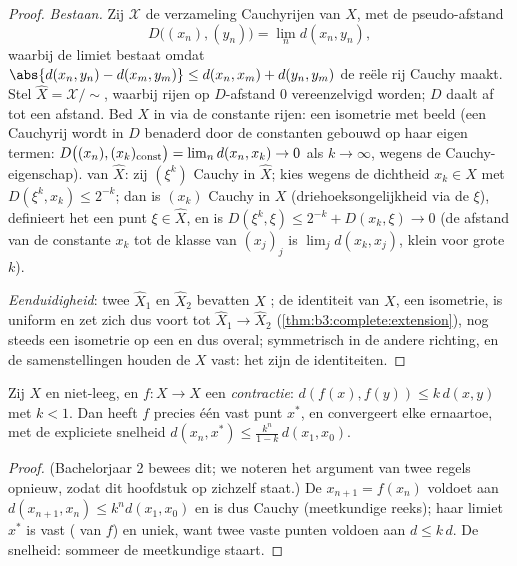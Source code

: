 \begin{proof}
\emph{Bestaan.} Zij $\mathcal X$ de verzameling Cauchyrijen van
$X$, met de pseudo-afstand
\[
D\bigl((x_n), (y_n)\bigr) = \lim_n d(x_n, y_n),
\]
waarbij de limiet bestaat omdat $\abs{d(x_n, y_n) - d(x_m, y_m)}
\leq d(x_n, x_m) + d(y_n, y_m)$ de reële rij Cauchy maakt. Stel
$\hat X = \mathcal X/{\sim}$, waarbij rijen op $D$-afstand $0$
vereenzelvigd worden; $D$ daalt af tot een afstand. Bed $X$ in via
de constante rijen: een isometrie met  beeld (een Cauchyrij
wordt in $D$ benaderd door de constanten gebouwd op haar eigen
termen: $D\bigl((x_n), (x_k)_{\rm const}\bigr) = \lim_n d(x_n,
x_k) \to 0$ als $k \to \infty$, wegens de Cauchy-eigenschap).
 van $\hat X$: zij $(\xi^k)$ Cauchy in $\hat X$; kies
wegens de dichtheid $x_k \in X$ met $D(\xi^k, x_k) \leq 2^{-k}$;
dan is $(x_k)$ Cauchy in $X$ (driehoeksongelijkheid via de $\xi$),
definieert het een punt $\xi \in \hat X$, en is $D(\xi^k, \xi)
\leq 2^{-k} + D(x_k, \xi) \to 0$ (de afstand van de constante
$x_k$ tot de klasse van $(x_j)_j$ is $\lim_j d(x_k, x_j)$, klein
voor grote $k$).

\emph{Eenduidigheid}: twee  $\hat X_1$ en $\hat
X_2$ bevatten $X$ ; de identiteit van $X$, een isometrie, is
uniform  en zet zich dus voort tot $\hat X_1 \to \hat X_2$
(\cref{thm:b3:complete:extension}), nog steeds een isometrie op
een  en dus overal; symmetrisch in de andere
richting, en de samenstellingen houden de  $X$ vast: het
zijn de identiteiten.
\end{proof}

\begin{theorem}\label{thm:b3:complete:banach}
Zij $X$  en niet-leeg, en $f \colon X \to X$ een
\emph{contractie}: $d(f(x), f(y)) \leq k\,d(x,y)$ met $k < 1$. Dan
heeft $f$ precies één vast punt $x^*$, en convergeert elke 
ernaartoe, met de expliciete snelheid $d(x_n, x^*) \leq
\frac{k^n}{1-k}\,d(x_1, x_0)$.
\end{theorem}

\begin{proof}
(Bachelorjaar 2 bewees dit; we noteren het argument van twee
regels opnieuw, zodat dit hoofdstuk op zichzelf staat.) De 
$x_{n+1} = f(x_n)$ voldoet aan $d(x_{n+1}, x_n) \leq k^nd(x_1,
x_0)$ en is dus Cauchy (meetkundige reeks); haar limiet $x^*$ is
vast ( van $f$) en uniek, want twee vaste punten
voldoen aan $d \leq k\,d$. De snelheid: sommeer de meetkundige
staart.
\end{proof}

